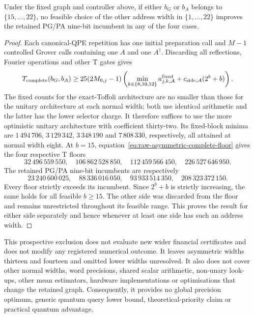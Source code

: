 \begin{theorem}
\label{thm:raw-asymmetric-high-width-exclusion}
Under the fixed graph and controller above, if either $b_G$ or $b_A$
belongs to $\{15,\ldots,22\}$, no feasible choice of the other
address width in $\{1,\ldots,22\}$ improves the retained PG/PA
nine-bit incumbent in any of the four cases.
\end{theorem}
\begin{proof}
Each canonical-QPE repetition has one initial preparation call and
$M-1$ controlled Grover calls containing one $A$ and one
$A^\dagger$. Discarding all reflections, Fourier operations and
other T gates gives
\begin{equation}
 T_{\rm complete}(b_G,b_A)
 \geq25(2M_{0,j}-1)
    \left(\min_{k\in\{8,10,12\}}a^{\rm fixed}_{j,k,\mathcal A}
           +c_{\rm side,\mathcal A}(2^b+b)\right).
\label{eq:raw-asymmetric-complete-floor}
\end{equation}
The fixed counts for the exact-Toffoli architecture are no smaller
than those for the unitary architecture at each normal width; both
use identical arithmetic and the latter has the lower selector charge.
It therefore suffices to use the more optimistic unitary architecture
with coefficient thirty-two. Its fixed-block minima are
$1\,494\,706$, $3\,129\,342$, $3\,348\,190$ and
$7\,808\,330$, respectively, all attained at normal width eight.
At $b=15$, equation~\eqref{eq:raw-asymmetric-complete-floor} gives
the four respective T floors
\begin{equation}
 32\,496\,559\,550,\quad106\,862\,528\,850,\quad
 112\,459\,566\,450,\quad226\,527\,646\,950.
\end{equation}
The retained PG/PA nine-bit incumbents are respectively
\begin{equation}
 23\,240\,600\,025,\quad88\,336\,016\,050,\quad
 93\,933\,514\,350,\quad208\,323\,372\,150.
\end{equation}
Every floor strictly exceeds its incumbent. Since $2^b+b$ is strictly
increasing, the same holds for all feasible $b\geq15$. The other
side was discarded from the floor and remains unrestricted throughout
its feasible range. This proves the result for either side separately
and hence whenever at least one side has such an address width.
\end{proof}

This prospective exclusion does not evaluate new wider financial
certificates and does not modify any registered numerical outcome.
It leaves asymmetric widths thirteen and fourteen and omitted lower
widths unresolved. It also does not cover other normal widths,
word precisions, shared scalar arithmetic, non-unary look-ups, other
mean estimators, hardware implementations or optimisations that change
the retained graph. Consequently, it provides no global precision
optimum, generic quantum query lower bound, theoretical-priority claim
or practical quantum advantage.
